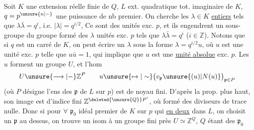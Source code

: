 Soit $K$ une extension   réelle finie de $Q$,
$L$ ext. quadratique tot. imaginaire de $K$,
$q=p^{\unsure{n|-}}$ une puissance de nb premier. On cherche
les $\lambda\in K$ \uline{entiers} tels que $\lambda\bar\lambda=q^i$, i.e.
$|\lambda|=q^{i/2}$,  Ce sont des unités exc. $p$, et
ils engendrent  un sous-groupe du
groupe 
formé des $\lambda$ unités exc. $p$ tels que
$\lambda\bar\lambda=q^i$ ($i\in\mathbb Z$). Notons que  si $q$ est un
carré de $K$, on peut écrire un $\lambda$
sous la forme $\lambda=q^{i/2}u$, où $u$ est une unité
exc. $p$ telle que $u\bar u=1$,  qui implique que
$u$ est une \uline{unité absolue} exc. $p$. Les $u$ forment
un groupe $U$, et l'hom
\[
U\unsure{\longrightarrow|-}\mathbb Z^P
\qquad u\unsure{\mapsto|\sim}\bigl(v_{\mathfrak p}\unsure{(u)|N(u)}\bigr)_{\mathfrak p\in P}
\]
(où $P$ désigne l'ens des $\mathfrak p$ de $L$ sur $p$) est
de noyau fini. D'après la prop. plus haut,
son image est  d'indice fini  $\mathbb Z^{\deleted{\unsure{Q}}P'}$, où
 formé des diviseurs de trace
 nulle. Donc si pour $\forall$ $\mathfrak p_0$  idéal premier de
$K$ sur $p$ qui \uline{ en deux} dans $L$, on choisit
un $\mathfrak p$ au dessus, on trouve un isom à un
groupe fini près $U\simeq\mathbb Z^Q$, $Q$ étant  des $\mathfrak p_0$

